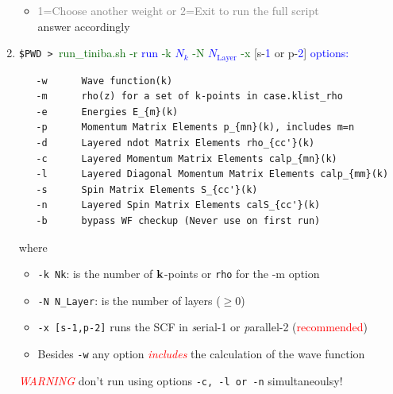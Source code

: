 \documentclass[openany,oneside]{book}
\numberwithin{equation}{section}
\begin{document}
\begin{enumerate}
\begin{itemize}
\item \textcolor{gray}{1=Choose another weight or
	2=Exit to run the full script}\\answer accordingly
\end{itemize}
\newpage
\item 
 \verb=$PWD > =\textcolor{darkgreen}{run\_tiniba.sh}
\textcolor{darkgreen}{-r} \textcolor{blue}{run} 
\textcolor{darkgreen}{-k} \textcolor{blue}{$N_k$} 
\textcolor{darkgreen}{-N} \textcolor{blue}{$N_{\mathrm{Layer}}$} 
\textcolor{darkgreen}{-x} [s-\textcolor{blue}{1} or
p-\textcolor{blue}{2}] \textcolor{blue}{options:}  
\begin{verbatim}
   -w      Wave function(k)
   -m      rho(z) for a set of k-points in case.klist_rho
   -e      Energies E_{m}(k)
   -p      Momentum Matrix Elements p_{mn}(k), includes m=n
   -d      Layered ndot Matrix Elements rho_{cc'}(k) 
   -c      Layered Momentum Matrix Elements calp_{mn}(k)
   -l      Layered Diagonal Momentum Matrix Elements calp_{mm}(k)
   -s      Spin Matrix Elements S_{cc'}(k)
   -n      Layered Spin Matrix Elements calS_{cc'}(k)
   -b      bypass WF checkup (Never use on first run)
\end{verbatim}
where
\begin{itemize}
\item \verb=-k Nk=: is the number of $\mathbf{k}$-points or \verb=rho= for
the  -m option
\item \verb=-N N_Layer=: is the number of
layers ($\geq 0$) %
\item \verb=-x [s-1,p-2]= runs the SCF in {\it s}erial-1 or {\it p}arallel-2 (\textcolor{red}{recommended})
\item Besides \verb=-w= 
any option \textcolor{red}{{\it includes}} the
   calculation of the wave function
\end{itemize}


\textcolor{red}{{\it WARNING}} don't run using options 
\verb=-c, -l or -n= simultaneoulsy!


\end{enumerate}
\end{document}
